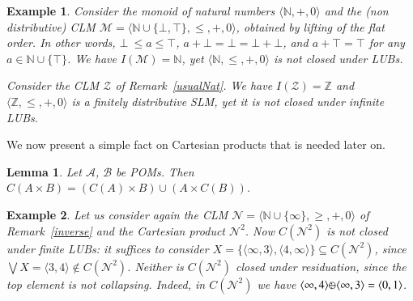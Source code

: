 \documentclass[a4paper]{elsarticle}
\newtheorem{example}{Example}
\newtheorem{lemma}{Lemma}
\newcommand{\1}{\mathbf{1}}
\def\odiv{{ \ominus\hspace{-8pt}:}\;}
\begin{document}
\begin{example}\label{flat}
	Consider
	the monoid of natural numbers $\langle \mathbb N, +, 0 \rangle$ and 
	the (non distributive) CLM $\mathcal{M} = \langle \mathbb{N} \cup \{\bot,\top\}, \leq, +, 0\rangle$,
	obtained by lifting of the flat order. In other words,  $\bot\ \leq a \leq \top$,
	$a + \bot = \bot = \bot + \bot$, and $a + \top = \top$  for any $a \in \mathbb N \cup \{\top\}$.
	We have $I(\mathcal{M}) =  \mathbb{N}$, yet $\langle \mathbb N, \leq, +, 0\rangle$ is not closed under LUBs. 
	
	Consider the CLM $\mathcal{Z}$ of Remark~\ref{usualNat}.	
	We have $I(\mathcal{Z}) = \mathbb{Z}$ and $\langle \mathbb{Z}, \leq, +, 0\rangle$ is a finitely distributive SLM, yet
	it is not closed under infinite LUBs.
\end{example}

We now present a simple fact on Cartesian products  that is needed later on.

\begin{lemma}
	Let $\mathcal{A}$, $\mathcal{B}$ be POMs.
	Then $C(A \times B) = (C(A) \times B) \cup (A \times C(B))$. 
\end{lemma}

\begin{example}
	\label{noLUBs}
	Let us consider again the CLM $\mathcal{N} = \langle \mathbb N \cup \{\infty\}, \geq, +, 0 \rangle$ 
	of Remark~\ref{inverse} and the Cartesian product $\mathcal{N}^2$. 
	Now $C(\mathcal{N}^2)$ is not closed under finite LUBs: it suffices to consider 
	$X= \{\langle \infty, 3 \rangle, \langle 4, \infty \rangle\} \subseteq C(\mathcal{N}^2)$,
	since $\bigvee X  = \langle 3,4 \rangle \not \in C(\mathcal{N}^2)$.
	Neither is $C(\mathcal{N}^2)$ closed under residuation, 
	since the top element is not collapsing.
	Indeed, in $C(\mathcal{N}^2)$ we have 
	$\langle \infty, 4 \rangle  \odiv \langle \infty, 3 \rangle = \langle 0,1\rangle$.
\end{example}
\end{document}
